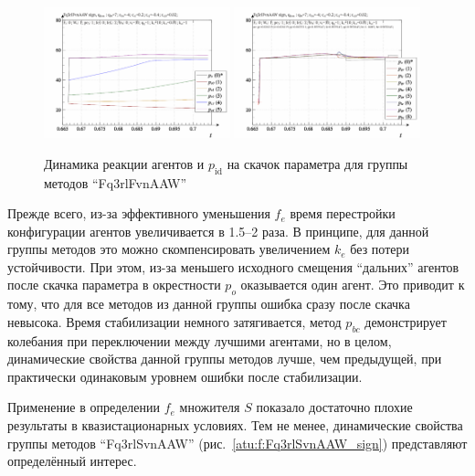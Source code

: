 \begin{figure}[htb!]
  \centerline{
    \includegraphics[width=0.48\textwidth]{p/sign/qls-p_t_pi_m_Fq3rlFvnAAW_sign.png}
    \hfill
    \includegraphics[width=0.48\textwidth]{p/sign/qls-p_t_p_m_Fq3rlFvnAAW_sign.png}
  }
  \caption{Динамика реакции агентов и $p_\mathrm{id}$ на скачок параметра для группы методов ``Fq3rlFvnAAW''}
  \label{atu:f:Fq3rlFvnAAW_sign}
\end{figure}

Прежде всего, из-за эффективного уменьшения $f_e$
время перестройки конфигурации агентов увеличивается в 1.5--2 раза.
В принципе, для данной группы методов это можно скомпенсировать увеличением $k_e$
без потери устойчивости.
При этом, из-за меньшего исходного смещения ``дальних'' агентов
после скачка параметра в окрестности $p_o$ оказывается один агент.
Это приводит к тому, что для все методов из данной группы
ошибка сразу после скачка невысока. Время стабилизации
немного затягивается, метод $p_{bc}$ демонстрирует колебания
при переключении между лучшими агентами, но в целом,
динамические свойства данной группы методов лучше, чем предыдущей,
при практически одинаковым уровнем ошибки после стабилизации.

Применение в определении $f_e$ множителя $S$
показало достаточно плохие результаты в квазистационарных
условиях. Тем не менее, динамические свойства
группы методов ``Fq3rlSvnAAW''
(рис.~\ref{atu:f:Fq3rlSvnAAW_sign})
представляют определённый интерес.

